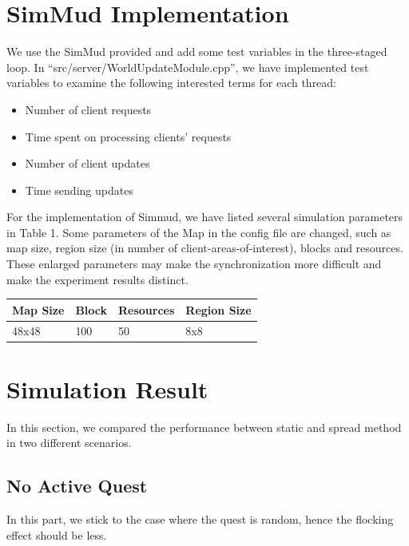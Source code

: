\documentclass[12pt,a4paper]{article} %
\theoremstyle{definition}
\theoremstyle{remark}
\begin{document}
\section{SimMud Implementation}
We use the SimMud provided and add some test variables in the three-staged loop. In ``src/server/WorldUpdateModule.cpp'', we have implemented test variables to examine the following interested terms for each thread:
\begin{itemize}
	\item Number of client requests
	\item Time spent on processing clients' requests
	\item Number of client updates
	\item Time sending updates
\end{itemize}

\vspace{3mm}


For the implementation of Simmud, we have listed several simulation parameters in Table 1.
Some parameters of the Map in the config file are changed, such as map size, region size (in number of client-areas-of-interest), blocks and resources. These enlarged parameters may make the synchronization more difficult and make the experiment results distinct.

\begin{center}
    \begin{tabular}{ | l | l | l | l | }
    \hline
    Map Size & Block & Resources & Region Size\\ \hline
    48x48 & 100 & 50 & 8x8 \\ \hline
\end{tabular}


\end{center}

\vspace{3mm}



\vspace{3mm}

\section{Simulation Result}
In this section, we compared the performance between static and spread method in two different scenarios. 


\subsection{No Active Quest}
In this part, we stick to the case where the quest is random, hence the flocking effect should be less. 
\end{document}
